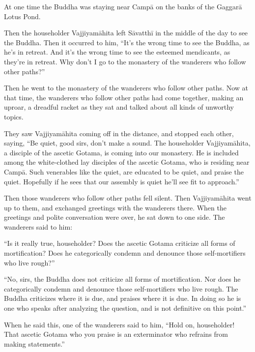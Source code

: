 \documentclass[12pt,openany]{book}%
\begin{document}
At one time the Buddha was staying near \textsanskrit{Campā} on the banks of the \textsanskrit{Gaggarā} Lotus Pond. 

Then the householder \textsanskrit{Vajjiyamāhita} left \textsanskrit{Sāvatthī} in the middle of the day to see the Buddha. Then it occurred to him, “It’s the wrong time to see the Buddha, as he’s in retreat. And it’s the wrong time to see the esteemed mendicants, as they’re in retreat. Why don’t I go to the monastery of the wanderers who follow other paths?” 

Then he went to the monastery of the wanderers who follow other paths. Now at that time, the wanderers who follow other paths had come together, making an uproar, a dreadful racket as they sat and talked about all kinds of unworthy topics. 

They saw \textsanskrit{Vajjiyamāhita} coming off in the distance, and stopped each other, saying, “Be quiet, good sirs, don’t make a sound. The householder \textsanskrit{Vajjiyamāhita}, a disciple of the ascetic Gotama, is coming into our monastery. He is included among the white-clothed lay disciples of the ascetic Gotama, who is residing near \textsanskrit{Campā}. Such venerables like the quiet, are educated to be quiet, and praise the quiet. Hopefully if he sees that our assembly is quiet he’ll see fit to approach.” 

Then those wanderers who follow other paths fell silent. Then \textsanskrit{Vajjiyamāhita} went up to them, and exchanged greetings with the wanderers there. When the greetings and polite conversation were over, he sat down to one side. The wanderers said to him: 

“Is it really true, householder? Does the ascetic Gotama criticize all forms of mortification? Does he categorically condemn and denounce those self-mortifiers who live rough?” 

“No, sirs, the Buddha does not criticize all forms of mortification. Nor does he categorically condemn and denounce those self-mortifiers who live rough. The Buddha criticizes where it is due, and praises where it is due. In doing so he is one who speaks after analyzing the question, and is not definitive on this point.” 

When he said this, one of the wanderers said to him, “Hold on, householder! That ascetic Gotama who you praise is an exterminator who refrains from making statements.” 
\end{document}
